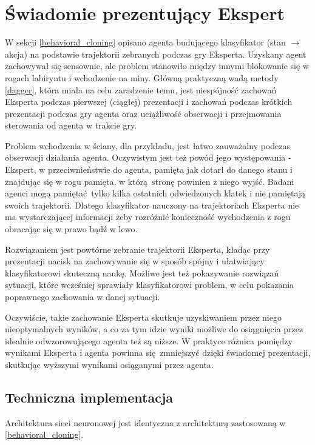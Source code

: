\section{Świadomie prezentujący Ekspert}\label{presenting_expert}
W sekcji \ref{behavioral_cloning} opisano agenta budującego klasyfikator (stan $\to$ akcja) na podstawie trajektorii zebranych podczas gry Eksperta. Uzyskany agent zachowywał się sensownie, ale problem stanowiło między innymi blokowanie się w rogach labiryntu i wchodzenie na miny. Główną praktyczną wadą metody \ref{dagger}, która miała na celu zaradzenie temu, jest niespójność zachowań Eksperta podczas pierwszej (ciągłej) prezentacji i zachowań podczas krótkich prezentacji podczas gry agenta oraz uciążliwość obserwacji i przejmowania sterowania od agenta w trakcie gry.

Problem wchodzenia w ściany, dla przykładu, jest łatwo zauważalny podczas obserwacji działania agenta. Oczywistym jest też powód jego występowania - Ekspert, w przeciwnieństwie do agenta, pamięta jak dotarł do danego stanu i znajdując się w rogu pamięta, w którą stronę powinien z niego wyjść. Badani agenci mogą pamiętać tylko kilka ostatnich odwiedzonych klatek i nie pamiętają swoich trajektorii. Dlatego klasyfikator nauczony na trajektoriach Eksperta nie ma wystarczającej informacji żeby rozróżnić konieczność wychodzenia z rogu obracając się w prawo bądź w lewo.

Rozwiązaniem jest powtórne zebranie trajektorii Eksperta, kładąc przy prezentacji nacisk na zachowywanie się w sposób spójny i ułatwiający klasyfikatorowi skuteczną naukę. Możliwe jest też pokazywanie rozwiązań sytuacji, które wcześniej sprawiały klasyfikatorowi problem, w celu pokazania poprawnego zachowania w danej sytuacji.

Oczywiście, takie zachowanie Eksperta skutkuje uzyskiwaniem przez niego nieoptymalnych wyników, a co za tym idzie wyniki możliwe do osiągnięcia przez idealnie odwzorowującego agenta też są niższe. W praktyce różnica pomiędzy wynikami Eksperta i agenta powinna się zmniejszyć dzięki świadomej prezentacji, skutkując wyższymi wynikami osiąganymi przez agenta.

\subsection{Techniczna implementacja}

Architektura sieci neuronowej jest identyczna z architekturą zastosowaną w \ref{behavioral_cloning}.

